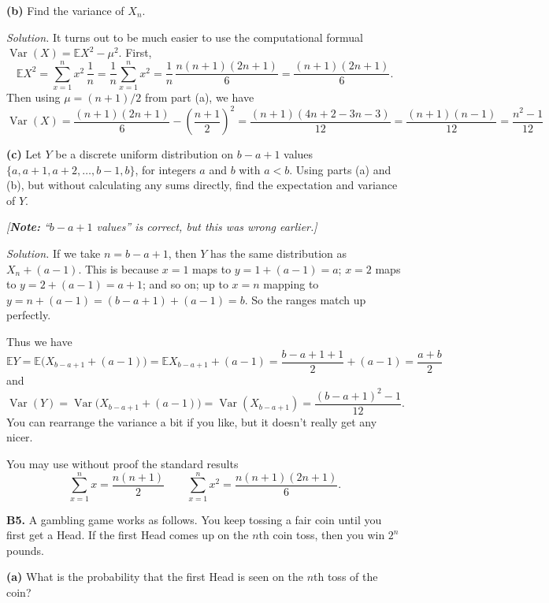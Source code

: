 \documentclass[
  a4paper,
]{book}
\theoremstyle{definition}
\theoremstyle{definition}
\theoremstyle{definition}
\theoremstyle{definition}
\theoremstyle{remark}
\begin{document}
\textbf{(b)} Find the variance of \(X_n\).

\begin{myanswers}
\emph{Solution.}
It turns out to be much easier to use the computational formual \(\operatorname{Var}(X) = \mathbb EX^2 - \mu^2\). First,
\[ \mathbb EX^2 = \sum_{x=1}^n x^2 \,\frac{1}{n}  = \frac{1}{n} \sum_{x = 1}^n x^2 = \frac{1}{n}\,\frac{n(n+1)(2n+1)}{6} = \frac{(n+1)(2n + 1)}{6} . \]
Then using \(\mu = (n+1)/2\) from part (a), we have
\[ \operatorname{Var}(X) =  \frac{(n+1)(2n + 1)}{6} - \left(\frac{n+1}{2}\right)^2 = \frac{(n+1)(4n + 2 - 3n -3)}{12} = \frac{(n+1)(n-1)}{12} = \frac{n^2 - 1}{12}  \]

\end{myanswers}

\textbf{(c)} Let \(Y\) be a discrete uniform distribution on \(b - a + 1\) values \(\{a, a+1, a+2, \dots, b-1, b\}\), for integers \(a\) and \(b\) with \(a<b\). Using parts (a) and (b), but without calculating any sums directly, find the expectation and variance of \(Y\).

\emph{{[}\textbf{Note:} ``\(b - a + 1\) values'' is correct, but this was wrong earlier.{]}}

\begin{myanswers}
\emph{Solution.} If we take \(n = b - a + 1\), then \(Y\) has the same distribution as \(X_n + (a-1)\). This is because \(x = 1\) maps to \(y = 1 + (a-1) = a\); \(x = 2\) maps to \(y = 2 + (a-1) = a+1\); and so on; up to \(x = n\) mapping to \(y = n + (a-1) = (b - a + 1) + (a-1) = b\). So the ranges match up perfectly.

Thus we have
\[ \mathbb EY = \mathbb E\big(X_{b-a+1} + (a-1)\big) = \mathbb EX_{b-a+1} + (a-1)= \frac{b - a + 1 +1}{2} + (a-1) = \frac{a + b}{2}  \]
and
\[ \operatorname{Var}(Y) = \operatorname{Var}\big(X_{b-a+1} + (a-1)\big) = \operatorname{Var}(X_{b-a+1}) = \frac{(b - a + 1)^2 - 1}{12} . \]
You can rearrange the variance a bit if you like, but it doesn't really get any nicer.

\end{myanswers}

You may use without proof the standard results
\[ \sum_{x=1}^n x = \frac{n(n+1)}{2} \qquad  \sum_{x=1}^n x^2 = \frac{n(n+1)(2n+1)}{6} . \]

\textbf{B5.} A gambling game works as follows. You keep tossing a fair coin until you first get a Head. If the first Head comes up on the \(n\)th coin toss, then you win \(2^n\) pounds.

\textbf{(a)} What is the probability that the first Head is seen on the \(n\)th toss of the coin?
\end{document}

